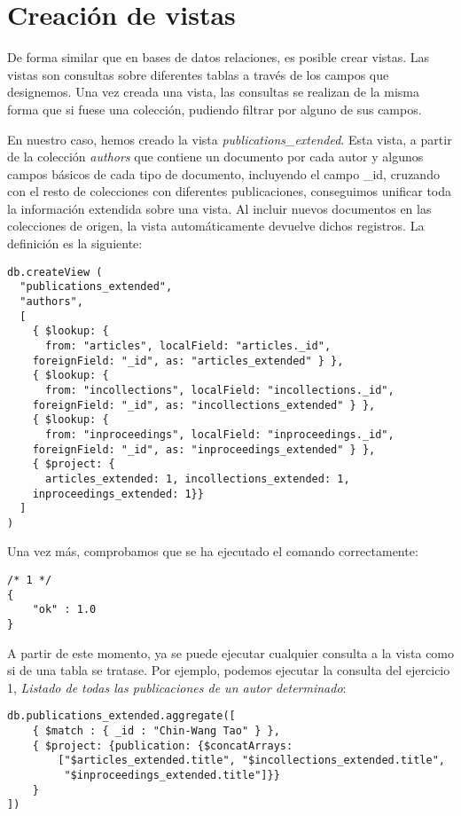 \section{Creación de vistas}\label{sec:parser}

De forma similar que en bases de datos relaciones, es posible crear vistas. Las vistas son consultas sobre diferentes tablas a través de los campos que designemos. Una vez creada una vista, las consultas se realizan de la misma forma que si fuese una colección, pudiendo filtrar por alguno de sus campos.

En nuestro caso, hemos creado la vista \textit{publications\_extended}. Esta vista, a partir de la colección \textit{authors} que contiene un documento por cada autor y algunos campos básicos de cada tipo de documento, incluyendo el campo \_id, cruzando con el resto de colecciones con diferentes publicaciones, conseguimos unificar toda la información extendida sobre una vista. Al incluir nuevos documentos en las colecciones de origen, la vista automáticamente devuelve dichos registros. La definición es la siguiente:

\begin{verbatim}
db.createView (
  "publications_extended",
  "authors",
  [
    { $lookup: { 
      from: "articles", localField: "articles._id",
    foreignField: "_id", as: "articles_extended" } },
    { $lookup: { 
      from: "incollections", localField: "incollections._id", 
    foreignField: "_id", as: "incollections_extended" } },
    { $lookup: { 
      from: "inproceedings", localField: "inproceedings._id",
    foreignField: "_id", as: "inproceedings_extended" } },
    { $project: { 
      articles_extended: 1, incollections_extended: 1,
    inproceedings_extended: 1}}
  ]
)
\end{verbatim}

Una vez más, comprobamos que se ha ejecutado el comando correctamente:

\begin{verbatim}
/* 1 */
{
    "ok" : 1.0
}
\end{verbatim}

A partir de este momento, ya se puede ejecutar cualquier consulta a la vista como si de una tabla se tratase. Por ejemplo, podemos ejecutar la consulta del ejercicio 1, \textit{Listado de todas las publicaciones de un autor determinado}:


\begin{verbatim}
db.publications_extended.aggregate([
    { $match : { _id : "Chin-Wang Tao" } },
    { $project: {publication: {$concatArrays:
        ["$articles_extended.title", "$incollections_extended.title",
         "$inproceedings_extended.title"]}}
    }
])
\end{verbatim}

